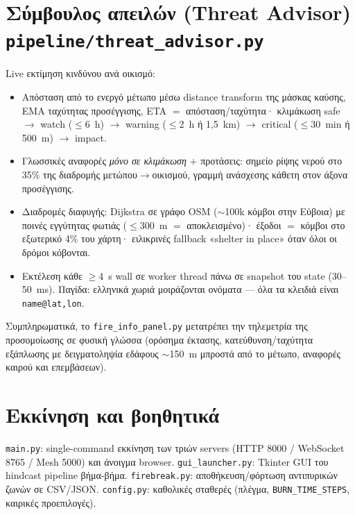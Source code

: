 \documentclass[11pt]{article}
\newcommand{\code}[1]{\texttt{#1}}
\begin{document}
\section{Σύμβουλος απειλών (Threat Advisor)
\code{pipeline/threat\_advisor.py}}

Live εκτίμηση κινδύνου ανά οικισμό:
\begin{itemize}
  \item Απόσταση από το ενεργό μέτωπο μέσω distance transform της μάσκας
        καύσης, EMA ταχύτητας προσέγγισης, ETA $=$ απόσταση/ταχύτητα·
        κλιμάκωση safe $\to$ watch ($\le$6~h) $\to$ warning ($\le$2~h ή
        1{,}5~km) $\to$ critical ($\le$30~min ή 500~m) $\to$ impact.
  \item Γλωσσικές αναφορές \emph{μόνο σε κλιμάκωση} $+$ προτάσεις: σημείο
        ρίψης νερού στο 35\% της διαδρομής μετώπου$\to$οικισμού, γραμμή
        ανάσχεσης κάθετη στον άξονα προσέγγισης.
  \item Διαδρομές διαφυγής: Dijkstra σε γράφο OSM ($\sim$100k κόμβοι στην
        Εύβοια) με ποινές εγγύτητας φωτιάς ($\le$300~m $=$ αποκλεισμένο)·
        έξοδοι $=$ κόμβοι στο εξωτερικό 4\% του χάρτη· ειλικρινές
        fallback «shelter in place» όταν όλοι οι δρόμοι κόβονται.
  \item Εκτέλεση κάθε $\ge$4~s wall σε worker thread πάνω σε snapshot του
        state (30--50~ms). Παγίδα: ελληνικά χωριά μοιράζονται ονόματα ---
        όλα τα κλειδιά είναι \code{name@lat,lon}.
\end{itemize}
Συμπληρωματικά, το \code{fire\_info\_panel.py} μετατρέπει την τηλεμετρία
της προσομοίωσης σε φυσική γλώσσα (ορόσημα έκτασης, κατεύθυνση/ταχύτητα
εξάπλωσης με δειγματοληψία εδάφους $\sim$150~m μπροστά από το μέτωπο,
αναφορές καιρού και επεμβάσεων).

\section{Εκκίνηση και βοηθητικά}

\code{main.py}: single-command εκκίνηση των τριών servers (HTTP 8000 /
WebSocket 8765 / Mesh 5000) και άνοιγμα browser. \code{gui\_launcher.py}:
Tkinter GUI του hindcast pipeline βήμα-βήμα. \code{firebreak.py}:
αποθήκευση/φόρτωση αντιπυρικών ζωνών σε CSV/JSON. \code{config.py}:
καθολικές σταθερές (πλέγμα, \code{BURN\_TIME\_STEPS}, καιρικές
προεπιλογές).
\end{document}
